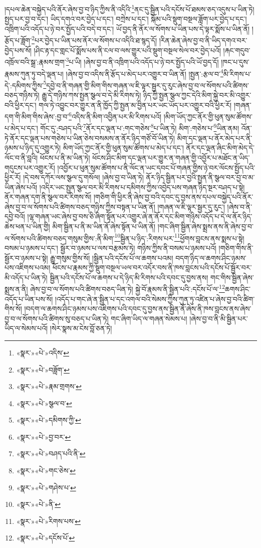 །དཔལ་ཆེན་བསྐྱེད་པའི་ནོར་ཞེས་བྱ་བ་ཉིད་ཀྱིས་ནི་འདིའི་\footnote{«སྣར་»«པེ་»འདིས་}ནང་དུ་སྦྱིན་པའི་དངོས་པོ་ཐམས་ཅད་འདུས་པ་ཡིན་ཏེ། སྤྱད་པར་བྱ་བ་དང་། ཡིད་དགའ་བར་བྱེད་པ་དང་། བཀྲེས་པ་དང་། སྐོམ་པའི་སྡུག་བསྔལ་ཟློག་པར་བྱེད་པ་དང་། འཁྲིག་པའི་འདོད་པ་ཉེ་བར་སྤྱོད་པའི་བདེ་བ་དང་། ཡོ་བྱད་ནི་ནོར་ལ་སོགས་པ་ཡིན་པས་དེ་ལྟར་སྨོས་པ་ཡིན་ནོ། །རྩོད་པ་ཟློག་\footnote{«སྣར་»«པེ་»བཟློག་}པར་བྱེད་པ་ཡིན་པས་ནོར་ལ་སོགས་པ་འདིའི་ཐ་སྙད་དོ། །རིན་ཆེན་ཞེས་བྱ་བ་ནི་ཡིད་དགའ་བར་བྱེད་པས་སོ། །ཤིང་རྟ་དང་གླང་པོ་སྨོས་པས་ནི་ངལ་བ་ལས་གྱུར་པའི་སྡུག་བསྔལ་སེལ་བར་བྱེད་པའོ། །རྐང་གདུབ་འཁྲོལ་བའི་སྒྲ་:རྣམས་གྲག་\footnote{«སྣར་»«པེ་»རྣམ་གྲགས་}པ་ཡི། །ཞེས་བྱ་བ་ནི་འཁྲིག་པའི་འདོད་པ་ཉེ་བར་སྤྱོད་པའི་ཡོ་བྱད་དོ། །ཁང་པ་དུས་རྣམས་ཀུན་ཏུ་བདེ་ལྡན་པ། །ཞེས་བྱ་བ་འདིས་ནི་རྩོད་པ་མེད་པར་འགྱུར་བ་ཡིན་ནོ། །སྤྱན་:རྩལ་བ་\footnote{«སྣར་»«པེ་»སྩལ་བ་}མི་རིགས་པ་དེ་:དམིགས་ཀྱིས་\footnote{«སྣར་»«པེ་»དམིགས་ཀྱི་}དབྱེ་བ་ནི་གཞན་གྱི་མིག་གིས་གཞན་ལ་ཇི་ལྟར་སྦྱར་དུ་རུང་ཞེས་བྱ་བ་ལ་སོགས་པའི་ཚིགས་བཅད་གཉིས་ཏེ། རྒྱུ་དེ་གཉིས་ཀས་སྤྱན་སྩལ་བ་དེ་མི་རིགས་ཏེ། ཉིད་ཀྱི་སྤྱན་སྩལ་ཀྱང་དེའི་མིག་སྐྱེ་བར་མི་འགྱུར་བའི་ཕྱིར་དང་། གལ་ཏེ་འབྱུང་བར་གྱུར་ན་ནི་ཁྱོད་ཀྱི་སྤྱན་མ་བྱིན་པར་ཡང་ཡོད་པར་འགྱུར་བའི་ཕྱིར་རོ། །གཞན་དག་གི་མིག་གིས་ཞེས་:བྱ་བ་\footnote{«སྣར་»«པེ་»བྱ་བར་}འདིས་ནི་མིག་འབྱིན་པར་མི་རིགས་པའོ། །མིག་ཡོད་ཀྱང་ནོར་གྱི་ཕུན་སུམ་ཚོགས་པ་མེད་པ་དང་། གོང་དུ་:བཤད་པའི་\footnote{«སྣར་»«པེ་»བཤད་པའི་ནི་}ནོར་དང་ལྡན་པ་:གང་གཅེས་\footnote{«སྣར་»«པེ་»གང་ཅེས་}པ་ཡིན་ཏེ། མིག་:གཅེས་པ་\footnote{«སྣར་»«པེ་»གཤེས་པ་}ཡིན་ནམ། འོན་ཏེ་ནོར་དང་ལྡན་པས་གཅེས་པ་ཡིན་ཅེས་བསམས་ན་ནོར་ཉིད་གཙོ་བོ་ཡིན་ཏེ། མིག་དང་ལྡན་པ་ནོར་མེད་པར་ནི་ཉམས་པ་ཉིད་དུ་འགྱུར་ཏེ། མིག་ཡོད་ཀྱང་ནོར་གྱི་ཕུན་སུམ་ཚོགས་པ་མེད་པ་དང་། ནོར་དང་ལྡན་ཞིང་མིག་མེད་དེ་ལོང་བ་ནི་བླའི། ཕོངས་པ་ནི་མ་ཡིན་ཏེ། ཕོངས་ཤིང་མིག་དང་ལྡན་པར་གྱུར་ན་གཞན་གྱི་འབྱོར་པ་མཐོང་ན་ཡིད་གདུངས་པར་འགྱུར་རོ། །འབྱོར་པ་ཕུན་སུམ་ཚོགས་པ་ནི་ལོང་ན་ཡང་དབང་པོ་གཞན་གྱིས་ཉེ་བར་ལོངས་སྤྱོད་པའི་ཕྱིར་རོ། །དེ་བས་དཀོར་ལས་སྩལ་དུ་གསོལ། །ཞེས་བྱ་བ་ཡིན་ཏེ། ནོར་ཉིད་སྦྱིན་པར་བྱའི་སྤྱན་ནི་སྩལ་བར་བྱ་བ་མ་ཡིན་ཞེས་པའོ། །འདིར་ཡང་སྤྱན་སྩལ་བར་མི་རིགས་པ་དམིགས་ཀྱིས་འབྱེད་པས་གཞན་ཉིད་སྔར་བཤད་པ་སྟེ། ནོར་གཞན་དག་ནི་སྩལ་བར་རིགས་སོ། །གཅིག་གི་ཕྱིར་ནི་ཞེས་བྱ་བའི་དབང་དུ་བྱས་ནས་དཔལ་བསྐྱེད་པའི་ནོར་ཞེས་བྱ་བ་ལ་སོགས་པའི་ཚིགས་བཅད་གཉིས་ཀྱིས་བསྟན་པ་ཡིན་ནོ། །གཞན་ལ་ཇི་ལྟར་སྦྱར་དུ་རུང་། །ཞེས་བ་ནི་དབྱེ་བའོ། །ལྷ་གཞན་ཡང་ཞེས་བྱ་བས་ཅི་ཞིག་སྟོན་པར་འགྱུར་ཞེ་ན་ནོར་དང་མིག་གཉིས་འདོད་པ་དེ་ལ་ནོར་ཉིད་ཆེས་ཕན་པ་ཡིན་གྱི། མིག་སྦྱིན་པ་ནི་མ་ཡིན་ནོ་ཞེས་སྟོན་པ་ཡིན་ནོ། །གང་ཞིག་སྦྱིན་ཞེས་སྨྲས་ནས་ནི་ཞེས་བྱ་བ་ལ་སོགས་པའི་ཚིགས་བཅད་གསུམ་གྱིས་:ནི་མིག་\footnote{«སྣར་»«པེ་»ནི་}སྦྱིན་པ་ཉིད་:རིགས་པར་\footnote{«སྣར་»«པེ་»རིགས་པས་}ཕྱོགས་བླངས་ནས་སྨས་པ་སྟེ། བསམ་པ་ཉམས་པ་དང་། སྦྱོར་བ་ཉམས་པ་ལས་བརྩམས་ཏེ། གཉིས་ཀྱིས་ནི་བསམ་པ་ཉམས་པའོ། །གཅིག་གིས་ནི་སྦྱོར་བ་ཉམས་པ་སྟེ། རྒྱུ་གསུམ་གྱིས་སོ། །སྦྱིན་པའི་དངོས་པོ་ལ་ཆགས་པའམ། བདག་ཉིད་ལ་ཆགས་ཤིང་ཉམས་པས་འཇིགས་པའམ། ཕོངས་པ་རྣམས་ཀྱི་སྡུག་བསྔལ་ཡལ་བར་འདོར་བས་ནི་ཁས་བླངས་པའི་དངོས་པོ་སྦྱོར་བར་མི་འདོད་པ་ཡིན་ཏེ། སྦྱིན་པའི་དངོས་པོ་ལ་ཆགས་པ་དེ་ཉིད་མི་རིགས་པའི་དབང་དུ་བྱས་ནས། གང་གིས་སྦྱིན་ཞེས་སྨྲས་ན་ནི། ཞེས་བྱ་བ་ལ་སོགས་པའི་ཚིགས་བཅད་ཡིན་ཏེ། སྐྱེ་བོ་རྣམས་ནི་སྦྱིན་པའི་:དངོས་པོ་ལ་\footnote{«སྣར་»«པེ་»དངོས་པོ་}ཆགས་ཤིང་འདོད་པ་ཡིན་པས་སོ། །འདོད་པ་གང་ཞེ་ན་སྦྱིན་པ་དང་འགལ་བའི་སེམས་ཀྱིས་ཀུན་ཏུ་འཛིན་པ་ཞེས་བྱ་བའི་ཚིག་གིས་སོ། །བདག་ལ་ཆགས་ཤིང་ཉམས་པས་འཇིགས་པའི་དབང་དུ་བྱས་ནས་སྦྱིན་ནོ་ཞེས་ནི་ཁས་བླངས་ནས་ཞེས་བྱ་བ་ལ་སོགས་པའི་ཚིགས་སུ་བཅད་པ་ཡིན་ཏེ། གང་ཞིག་ཡིད་ལ་གཞན་སེམས་པ། །ཞེས་བྱ་བ་ནི་མི་སྦྱིན་པར་ཡིད་ལ་སེམས་པའོ། །སེར་སྣས་མ་ངེས་བློ་ཅན་ཏེ། 